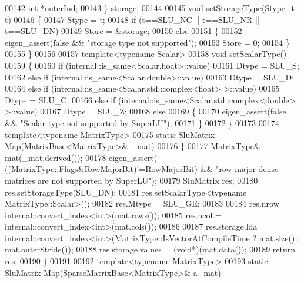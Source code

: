 \begin{DoxyCode}
00142     \textcolor{keywordtype}{int} *outerInd;
00143   \} storage;
00144 
00145   \textcolor{keywordtype}{void} setStorageType(Stype\_t t)
00146   \{
00147     Stype = t;
00148     \textcolor{keywordflow}{if} (t==SLU\_NC || t==SLU\_NR || t==SLU\_DN)
00149       Store = &storage;
00150     \textcolor{keywordflow}{else}
00151     \{
00152       eigen\_assert(\textcolor{keyword}{false} && \textcolor{stringliteral}{"storage type not supported"});
00153       Store = 0;
00154     \}
00155   \}
00156 
00157   \textcolor{keyword}{template}<\textcolor{keyword}{typename} Scalar>
00158   \textcolor{keywordtype}{void} setScalarType()
00159   \{
00160     \textcolor{keywordflow}{if} (internal::is\_same<Scalar,float>::value)
00161       Dtype = SLU\_S;
00162     \textcolor{keywordflow}{else} \textcolor{keywordflow}{if} (internal::is\_same<Scalar,double>::value)
00163       Dtype = SLU\_D;
00164     \textcolor{keywordflow}{else} \textcolor{keywordflow}{if} (internal::is\_same<Scalar,std::complex<float> >::value)
00165       Dtype = SLU\_C;
00166     \textcolor{keywordflow}{else} \textcolor{keywordflow}{if} (internal::is\_same<Scalar,std::complex<double> >::value)
00167       Dtype = SLU\_Z;
00168     \textcolor{keywordflow}{else}
00169     \{
00170       eigen\_assert(\textcolor{keyword}{false} && \textcolor{stringliteral}{"Scalar type not supported by SuperLU"});
00171     \}
00172   \}
00173 
00174   \textcolor{keyword}{template}<\textcolor{keyword}{typename} MatrixType>
00175   \textcolor{keyword}{static} SluMatrix Map(MatrixBase<MatrixType>& \_mat)
00176   \{
00177     MatrixType& mat(\_mat.derived());
00178     eigen\_assert( ((MatrixType::Flags&\hyperlink{group__flags_gae4f56c2a60bbe4bd2e44c5b19cbe8762}{RowMajorBit})!=RowMajorBit) && \textcolor{stringliteral}{"row-major dense matrices
       are not supported by SuperLU"});
00179     SluMatrix res;
00180     res.setStorageType(SLU\_DN);
00181     res.setScalarType<\textcolor{keyword}{typename} MatrixType::Scalar>();
00182     res.Mtype     = SLU\_GE;
00183 
00184     res.nrow      = internal::convert\_index<int>(mat.rows());
00185     res.ncol      = internal::convert\_index<int>(mat.cols());
00186 
00187     res.storage.lda       = internal::convert\_index<int>(MatrixType::IsVectorAtCompileTime ? mat.size() : 
      mat.outerStride());
00188     res.storage.values    = (\textcolor{keywordtype}{void}*)(mat.data());
00189     \textcolor{keywordflow}{return} res;
00190   \}
00191 
00192   \textcolor{keyword}{template}<\textcolor{keyword}{typename} MatrixType>
00193   \textcolor{keyword}{static} SluMatrix Map(SparseMatrixBase<MatrixType>& a\_mat)

\end{DoxyCode}
